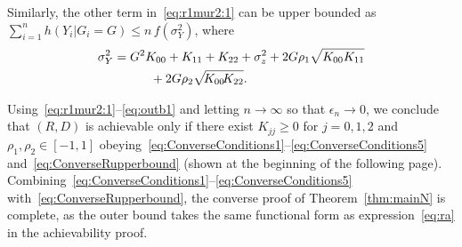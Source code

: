 \documentclass[journal]{IEEEtran}
\begin{document}
Similarly, the other term in~\eqref{eq:r1mur2:1} can be upper bounded as 
$\sum_{i=1}^n h(Y_i|G_i=G) \leq n\, f(\sigma_Y^2)$, 
where
\begin{align}
    \sigma_Y^2 
    &= G^2  K_{00} + K_{11} + K_{22} + \sigma_z^2 
    + 2G  \rho_1  \sqrt{K_{00}  K_{11}} \notag\\
    &\phantom{wwww}+ 2 G  \rho_2  \sqrt{\!K_{00} \! K_{22}}. \label{eq:outb1} 
\end{align}

Using~\eqref{eq:r1mur2:1}--\eqref{eq:outb1} and letting $n \to \infty$ so that $\epsilon_n \to 0$, we conclude that $(R, D)$ is achievable only if there exist 
$K_{jj} \geq 0$ for $j = 0, 1, 2$ and $\rho_1, \rho_2 \in [-1,1]$ obeying~\eqref{eq:ConverseConditions1}--\eqref{eq:ConverseConditions5} and~\eqref{eq:ConverseRupperbound} (shown at the beginning of the following page). 
Combining~\eqref{eq:ConverseConditions1}--\eqref{eq:ConverseConditions5} 
with~\eqref{eq:ConverseRupperbound}, the converse proof of Theorem~\ref{thm:mainN} is complete, as the outer bound takes the same functional form as expression~\eqref{eq:ra} in the achievability proof.

\end{document}
